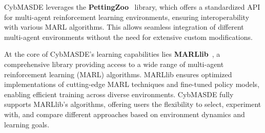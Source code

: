 \documentclass[journal]{IEEEtai}
\begin{document}
CybMASDE leverages the \textbf{PettingZoo}~\cite{Terry2021} library, which offers a standardized API for multi-agent reinforcement learning environments, ensuring interoperability with various MARL algorithms. This allows seamless integration of different multi-agent environments without the need for extensive custom modifications.

At the core of CybMASDE's learning capabilities lies \textbf{MARLlib}~\cite{hu2022marllib}, a comprehensive library providing access to a wide range of multi-agent reinforcement learning (MARL) algorithms. MARLlib ensures optimized implementations of cutting-edge MARL techniques and fine-tuned policy models, enabling efficient training across diverse environments. CybMASDE fully supports MARLlib's algorithms, offering users the flexibility to select, experiment with, and compare different approaches based on environment dynamics and learning goals.
\end{document}
